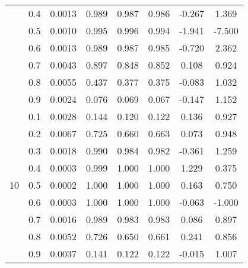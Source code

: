 \documentclass[11pt,a4paper]{report}
\begin{document}
\begin{longtable}{ | c | c || c | c | c | c | c | c | }
 & 0.4 & 0.0013 & 0.989 & 0.987 & 0.986 & -0.267 & 1.369 \\
 & 0.5 & 0.0010 & 0.995 & 0.996 & 0.994 & -1.941 & -7.500 \\
 & 0.6 & 0.0013 & 0.989 & 0.987 & 0.985 & -0.720 & 2.362 \\
 & 0.7 & 0.0043 & 0.897 & 0.848 & 0.852 & 0.108 & 0.924 \\
 & 0.8 & 0.0055 & 0.437 & 0.377 & 0.375 & -0.083 & 1.032 \\
 & 0.9 & 0.0024 & 0.076 & 0.069 & 0.067 & -0.147 & 1.152 \\
 \hline
\multirow{9}{*}{10} & 0.1 & 0.0028 & 0.144 & 0.120 & 0.122 & 0.136 & 0.927 \\
 & 0.2 & 0.0067 & 0.725 & 0.660 & 0.663 & 0.073 & 0.948 \\
 & 0.3 & 0.0018 & 0.990 & 0.984 & 0.982 & -0.361 & 1.259 \\
 & 0.4 & 0.0003 & 0.999 & 1.000 & 1.000 & 1.229 & 0.375 \\
 & 0.5 & 0.0002 & 1.000 & 1.000 & 1.000 & 0.163 & 0.750 \\
 & 0.6 & 0.0003 & 1.000 & 1.000 & 1.000 & -0.063 & -1.000 \\
 & 0.7 & 0.0016 & 0.989 & 0.983 & 0.983 & 0.086 & 0.897 \\
 & 0.8 & 0.0052 & 0.726 & 0.650 & 0.661 & 0.241 & 0.856 \\
 & 0.9 & 0.0037 & 0.141 & 0.122 & 0.122 & -0.015 & 1.007 \\
 \hline
\hline
\end{longtable}
\end{document}
